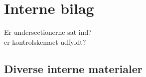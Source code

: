 \chapter{Interne bilag}
Er undersectionerne sat ind?\\
er kontrolskemaet udfyldt?






\section{Diverse interne materialer}
\clearpage

